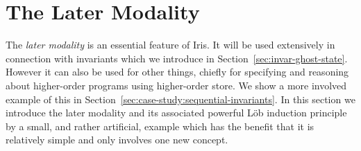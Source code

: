 \section{The Later Modality}
\label{sec:introducing-later}

\newcommand{\lobrule}[1][]
{\rulegenhref[#1]{L{\"o}b}{Loeb}
  {Q \land \later\prop \proves \prop}
  {Q \proves \prop}}
\newcommand{\latermonorule}[1][]
{\rulegenhref[#1]{later-mono}{Later-Mono}
 {Q \proves \prop}
 {\later Q \proves \later\prop}}
\newcommand{\laterweakrule}[1][]
{\rulegenhref[#1]{later-weak}{Later-weak}
{Q \proves \prop}
{Q \proves \later{\prop}}}
\newcommand{\laterexistsrule}[1][]
{\rulegenhref[#1]{$\later$-$\exists$}{later-exists}
  {\text{$\type$ is inhabited} \and Q \proves \later{\Exists x:\type.\prop}}
  {Q \proves \Exists x:\type. \later\prop}}
\newcommand{\existslaterrule}[1][]
{\rulegenhref[#1]{$\exists$-$\later$}{exists-later}
  {Q \proves \Exists x. \later P}
  {Q \proves \later{\Exists x.\prop}}}
\newcommand{\laterconjrule}[1][]
{\rulegenhrefb[#1]{later-$\wedge$}{Later-conj}
  {R \proves \later (P \land Q)}
  {R \proves \later P \land \later Q}}
\newcommand{\laterdisjrule}[1][]
{\rulegenhrefb[#1]{later-$\vee$}{Later-disj}
  {R \proves \later (P \lor Q)}
  {R \proves \later P \lor \later Q}}
\newcommand{\laterforallrule}[1][]
{\rulegenhrefb[#1]{later-$\forall$}{Later-all}
  {Q \proves \later{\All x.P}}
  {Q \proves \All x. \later P}}
\newcommand{\laterseprule}[1][]
{\rulegenhrefb[#1]{later-$\ast$}{Later-sep}
  {R \proves \later P \ast \later Q}
  {R \proves \later (P \ast Q)}}

\newcommand{\htbetalater}[1][]{\htbetagen[-later#1]{\later}{ }}
\newcommand{\htloadlaterrule}[1][]{\htloadgen[#1]{\later}}
\newcommand{\htstorelaterrule}[1][]{\htstoregen[#1]{\later}}
\newcommand{\htreclaterrule}[1][]{\htrecgen[#1]{\later}}
\newcommand{\htmatchlaterrule}[1][]{\htmatchgen[#1]{\later}}
\newcommand{\htletlaterrule}[1][]{\htletgen[#1]{\later}}
\newcommand{\htletdetlaterrule}[1][]{\htletdetgen[#1]{\later}}
\newcommand{\htseqlaterrule}[1][]{\htseqgen[#1]{\later}}
\newcommand{\htiflaterrule}[1][]{\htifgen[#1]{\later}}

The \emph{later modality} is an essential feature of Iris.  It will be
used extensively in connection with invariants which we introduce in
Section~\ref{sec:invar-ghost-state}.  However it can also be used for
other things, chiefly for specifying and reasoning about higher-order
programs using higher-order store.  We show a more involved example of
this in
Section~\ref{sec:case-study:sequential-invariants}.  In
this section we introduce the later modality and its associated
powerful L\"ob induction principle by a small, and rather artificial,
example which has the benefit that it is relatively simple and only
involves one new concept.

